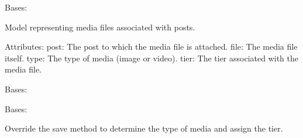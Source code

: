 \documentclass[letterpaper,10pt,english]{sphinxmanual}
\begin{document}
\begin{fulllineitems}
\label{\detokenize{modules/models:creator.models.Media}}
\pysigstartsignatures
{}
\pysigstopsignatures
\sphinxAtStartPar
Bases: 

\sphinxAtStartPar
Model representing media files associated with posts.

\sphinxAtStartPar
Attributes:
\sphinxhyphen{} post: The post to which the media file is attached.
\sphinxhyphen{} file: The media file itself.
\sphinxhyphen{} type: The type of media (image or video).
\sphinxhyphen{} tier: The tier associated with the media file.

\begin{fulllineitems}
\label{\detokenize{modules/models:creator.models.Media.DoesNotExist}}
\pysigstartsignatures
{}
\pysigstopsignatures
\sphinxAtStartPar
Bases: 

\end{fulllineitems}


\begin{fulllineitems}
\label{\detokenize{modules/models:creator.models.Media.MultipleObjectsReturned}}
\pysigstartsignatures
{}
\pysigstopsignatures
\sphinxAtStartPar
Bases: 

\end{fulllineitems}


\begin{fulllineitems}
\label{\detokenize{modules/models:creator.models.Media.save}}
\pysigstartsignatures
{}
\pysigstopsignatures
\sphinxAtStartPar
Override the save method to determine the type of media and assign the tier.

\end{fulllineitems}


\end{fulllineitems}
\end{document}
